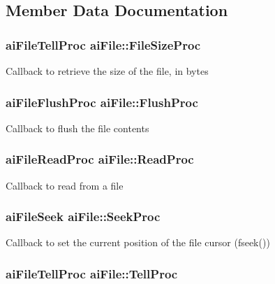 \subsection{Member Data Documentation}
\hypertarget{structai_file_aff2fff8c0458e7ec71f7de217c3a3033}{
\subsubsection[{File\-Size\-Proc}]{\setlength{\rightskip}{0pt plus 5cm}ai\-File\-Tell\-Proc ai\-File\-::\-File\-Size\-Proc}}\label{structai_file_aff2fff8c0458e7ec71f7de217c3a3033}
Callback to retrieve the size of the file, in bytes \hypertarget{structai_file_a1102d28d1c0be68ffed20476669bdb0d}{
\subsubsection[{Flush\-Proc}]{\setlength{\rightskip}{0pt plus 5cm}ai\-File\-Flush\-Proc ai\-File\-::\-Flush\-Proc}}\label{structai_file_a1102d28d1c0be68ffed20476669bdb0d}
Callback to flush the file contents \hypertarget{structai_file_a52287e81ca67b9d43cc1ce6142f781fa}{
\subsubsection[{Read\-Proc}]{\setlength{\rightskip}{0pt plus 5cm}ai\-File\-Read\-Proc ai\-File\-::\-Read\-Proc}}\label{structai_file_a52287e81ca67b9d43cc1ce6142f781fa}
Callback to read from a file \hypertarget{structai_file_a7a07b499be4ad433669246479a4d4ad2}{
\subsubsection[{Seek\-Proc}]{\setlength{\rightskip}{0pt plus 5cm}ai\-File\-Seek ai\-File\-::\-Seek\-Proc}}\label{structai_file_a7a07b499be4ad433669246479a4d4ad2}
Callback to set the current position of the file cursor (fseek()) \hypertarget{structai_file_aaf2d88a3b2fcbdacf51119658283d27e}{
\subsubsection[{Tell\-Proc}]{\setlength{\rightskip}{0pt plus 5cm}ai\-File\-Tell\-Proc ai\-File\-::\-Tell\-Proc}}\label{structai_file_aaf2d88a3b2fcbdacf51119658283d27e}
